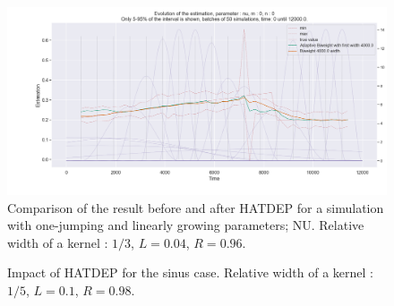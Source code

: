 \begin{figure}
\centering
\includegraphics[width = 0.90 \textwidth]{../imag/chap3/3/L.png}
\caption{Comparison of the result before and after HATDEP for a simulation with one-jumping and linearly growing parameters; NU. Relative width of a kernel : $1/3$, $L = 0.04$, $R = 0.96$.}
\label{fig:first_estimate_3_nu}
\end{figure}















\begin{figure}
\centering
{} 
\caption{Impact of HATDEP for  the sinus case. Relative width of a kernel : $1/5$, $L = 0.1$, $R = 0.98$.}
\label{fig:compar_kernels_4}
\end{figure}

